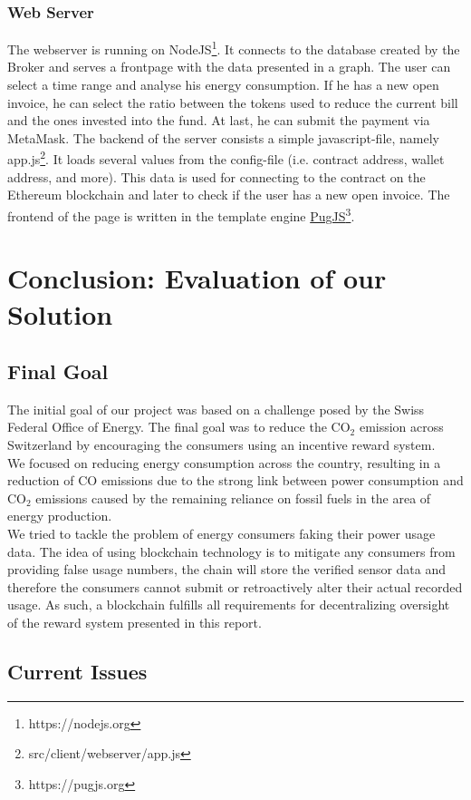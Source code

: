 \documentclass[11pt]{article}
\begin{document}
\subsubsection{Web Server}
The webserver is running on NodeJS\footnote{https://nodejs.org}. It connects to the database created by the Broker and serves a frontpage with the data presented in a graph. The user can select a time range and analyse his energy consumption. If he has a new open invoice, he can select the ratio between the tokens used to reduce the current bill and the ones invested into the fund. At last, he can submit the payment via MetaMask. The backend of the server consists a simple javascript-file, namely app.js\footnote{src/client/webserver/app.js}. It loads several values from the config-file (i.e. contract address, wallet address, and more). This data is used for connecting to the contract on the Ethereum blockchain and later to check if the user has a new open invoice. The frontend of the page is written in the template engine \hyperref[https://pugjs.org]{PugJS}\footnote{https://pugjs.org}.

\section{Conclusion: Evaluation of our Solution}

\subsection{Final Goal}
The initial goal of our project was based on a challenge posed by the Swiss Federal Office of Energy. The final goal was to reduce the CO$_2$ emission across Switzerland by encouraging the consumers using an incentive reward system.\\
We focused on reducing energy consumption across the country, resulting in a reduction of CO emissions due to the strong link between power consumption and CO$_2$ emissions caused by the remaining reliance on fossil fuels in the area of energy production.\\
We tried to tackle the problem of energy consumers faking their power usage data. The idea of using blockchain technology is to mitigate any consumers from providing false usage numbers, the chain will store the verified sensor data and therefore the consumers cannot submit or retroactively alter their actual recorded usage. As such, a blockchain fulfills all requirements for decentralizing oversight of the reward system presented in this report.
\subsection{Current Issues}
\end{document}
